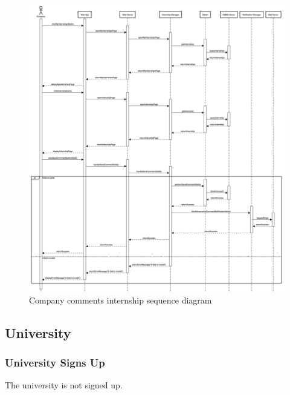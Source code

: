 \begin{figure}[h!] 
    \centering
    \includegraphics[width=16cm]{images/sequence-diagrams/company-comments-internship.png}
    \caption{Company comments internship sequence diagram}
\end{figure}

\clearpage
\subsection{University}
\subsubsection{University Signs Up}
The university is not signed up.

